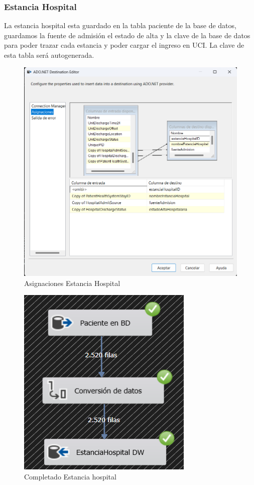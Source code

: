 \documentclass{article}
\begin{document}
	\subsubsection{Estancia Hospital}
	La estancia hospital esta guardado en la tabla paciente de la base de datos, guardamos la fuente de admisión el estado de alta y la clave de la base de datos para poder trazar cada estancia y poder cargar el ingreso en UCI. La clave de esta tabla será autogenerada.
		\begin{figure}[H]
		\centering
		\includegraphics[width=.7\linewidth]{./images/asignaciones/estancia_hospital.png}
		\caption{Asignaciones Estancia Hospital}
	\end{figure}


	\begin{figure}[H]
		\centering
		\includegraphics[width=.3\linewidth]{./images/completados/estancia_hospital.png}
		\caption{Completado Estancia hospital}
	\end{figure}
\end{document}
